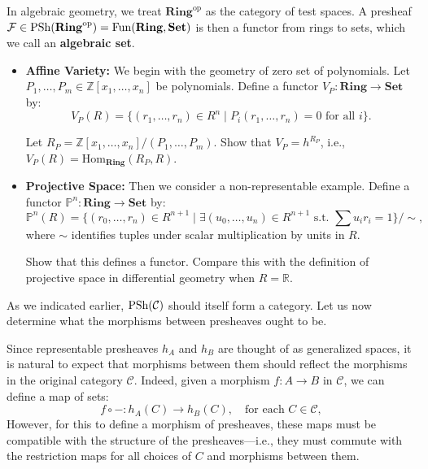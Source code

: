 \begin{example}
In algebraic geometry, we treat $\mathbf{Ring}^{\mathrm{op}}$ as the category of test spaces. A presheaf $\mathcal{F} \in \mathrm{PSh}(\mathbf{Ring}^{\mathrm{op}}) = \mathrm{Fun}(\mathbf{Ring}, \mathbf{Set})$ is then a functor from rings to sets, which we call an \textbf{algebraic set}.
\begin{itemize}
    \item \textbf{Affine Variety:} We begin with the geometry of zero set of polynomials. Let $P_1, \ldots, P_m \in \mathbb{Z}[x_1, \ldots, x_n]$ be polynomials. Define a functor $V_P: \mathbf{Ring} \to \mathbf{Set}$ by:
    \[
    V_P(R) = \{ (r_1, \ldots, r_n) \in R^n \mid P_i(r_1, \ldots, r_n) = 0 \text{ for all } i \}.
    \]
    \begin{exercise}
    Let $R_P = \mathbb{Z}[x_1, \ldots, x_n]/(P_1, \ldots, P_m)$. Show that $V_P = h^{R_P}$, i.e., $V_P(R) = \mathrm{Hom}_{\mathbf{Ring}}(R_P, R)$.
    \end{exercise}

    \item \textbf{Projective Space:} Then we consider a non-representable example. Define a functor $\mathbb{P}^n: \mathbf{Ring} \to \mathbf{Set}$ by:
    \[
    \mathbb{P}^n(R) = \{ (r_0, \ldots, r_n) \in R^{n+1} \mid \exists (u_0, \ldots, u_n) \in R^{n+1} \text{ s.t. } \sum u_i r_i = 1 \}/\sim,
    \]
    where $\sim$ identifies tuples under scalar multiplication by units in $R$.

    \begin{exercise}
    Show that this defines a functor. Compare this with the definition of projective space in differential geometry when $R = \mathbb{R}$.
    \end{exercise}
\end{itemize}
\end{example}

As we indicated earlier, $\mathrm{PSh}(\mathcal{C})$ should itself form a category. Let us now determine what the morphisms between presheaves ought to be.

Since representable presheaves $h_A$ and $h_B$ are thought of as generalized spaces, it is natural to expect that morphisms between them should reflect the morphisms in the original category $\mathcal{C}$. Indeed, given a morphism $f: A \to B$ in $\mathcal{C}$, we can define a map of sets:
\[
f \circ - : h_A(C) \to h_B(C), \quad \text{for each } C \in \mathcal{C},
\]
However, for this to define a morphism of presheaves, these maps must be compatible with the structure of the presheaves—i.e., they must commute with the restriction maps for all choices of $C$ and morphisms between them.

